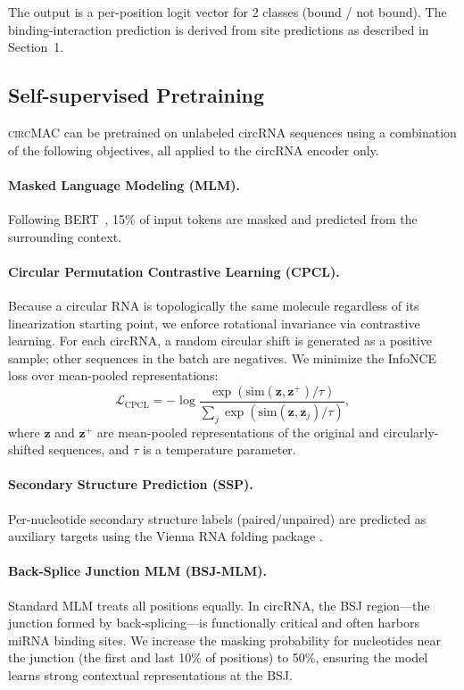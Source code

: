\documentclass[11pt]{article}
\newcommand{\model}{\textsc{circMAC}}
\begin{document}
\noindent
The output is a per-position logit vector for 2 classes (bound / not bound).
The binding-interaction prediction is derived from site predictions as
described in Section~1.


\subsection{Self-supervised Pretraining}

\model{} can be pretrained on unlabeled circRNA sequences using a combination
of the following objectives, all applied to the circRNA encoder only.

\paragraph{Masked Language Modeling (MLM).}
Following BERT~\cite{devlin2019bert}, 15\% of input tokens are masked and
predicted from the surrounding context.

\paragraph{Circular Permutation Contrastive Learning (CPCL).}
Because a circular RNA is topologically the same molecule regardless of
its linearization starting point, we enforce rotational invariance via
contrastive learning.
For each circRNA, a random circular shift is generated as a positive sample;
other sequences in the batch are negatives.
We minimize the InfoNCE loss over mean-pooled representations:
\begin{equation}
  \mathcal{L}_{\text{CPCL}} = -\log
    \frac{\exp(\text{sim}(\mathbf{z}, \mathbf{z}^+)/\tau)}
         {\sum_{j}\exp(\text{sim}(\mathbf{z}, \mathbf{z}_j)/\tau)},
\end{equation}
where $\mathbf{z}$ and $\mathbf{z}^+$ are mean-pooled representations of
the original and circularly-shifted sequences, and $\tau$ is a temperature
parameter.

\paragraph{Secondary Structure Prediction (SSP).}
Per-nucleotide secondary structure labels (paired/unpaired) are predicted
as auxiliary targets using the Vienna RNA folding package \cite{lorenz2011}.

\paragraph{Back-Splice Junction MLM (BSJ-MLM).}
Standard MLM treats all positions equally.
In circRNA, the BSJ region---the junction formed by back-splicing---is
functionally critical and often harbors miRNA binding sites.
We increase the masking probability for nucleotides near the junction
(the first and last 10\% of positions) to 50\%, ensuring the model
learns strong contextual representations at the BSJ.
\end{document}
